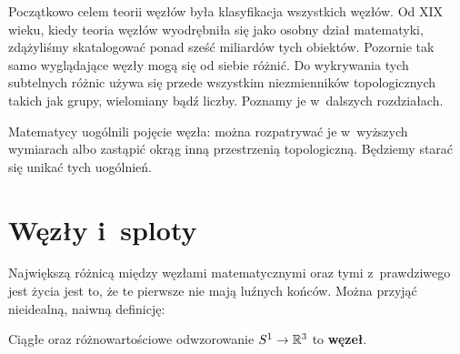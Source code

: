 Początkowo celem teorii węzłów była klasyfikacja wszystkich węzłów.
Od XIX wieku, kiedy teoria węzłów wyodrębniła się jako osobny dział matematyki,
zdążyliśmy skatalogować ponad sześć miliardów tych obiektów.
Pozornie tak samo wyglądające węzły mogą się od siebie różnić.
Do wykrywania tych subtelnych różnic używa się przede wszystkim niezmienników topologicznych takich jak grupy, wielomiany bądź liczby.
Poznamy je w~dalszych rozdziałach.

Matematycy uogólnili pojęcie węzła:
można rozpatrywać je w~wyższych wymiarach albo zastąpić okrąg inną przestrzenią topologiczną.
Będziemy starać się unikać tych uogólnień.

\section{Węzły i~sploty}
Największą różnicą między węzłami matematycznymi oraz tymi z~prawdziwego jest życia jest to, że te pierwsze nie mają luźnych końców.
Można przyjąć nieidealną, naiwną definicję:

\begin{definition}
    Ciągłe oraz różnowartościowe odwzorowanie $S^1 \to \mathbb R^3$ to \textbf{węzeł}.
\end{definition}

